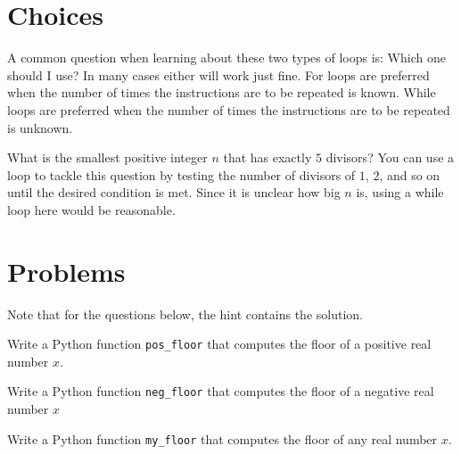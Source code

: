 \documentclass{ximera}
\begin{document}
\section{Choices}

A common question when learning about these two types of loops is: Which one should I use? In many cases either will work just fine. For loops are preferred when the number of times the instructions are to be repeated is known. While loops are preferred when the number of times the instructions are to be repeated is unknown.

What is the smallest positive integer $n$ that has exactly $5$ divisors? You can use a loop to tackle this question by testing the number of divisors of $1$, $2$, and so on until the desired condition is met. Since it is unclear how big $n$ is, using a while loop here would be reasonable.

\section{Problems}

Note that for the questions below, the hint contains the solution.

\begin{question}
	Write a Python function \verb|pos_floor| that computes the floor of a positive real number $x$.
\begin{hint}
\begin{sageCell}

\end{sageCell}
\end{hint}
\end{question}

\begin{question}
	Write a Python function \verb|neg_floor| that computes the floor of a negative real number $x$
\begin{hint}
\begin{sageCell}

\end{sageCell}
\end{hint}
\end{question}

\begin{question}
	Write a Python function \verb|my_floor| that computes the floor of any real number $x$.
\begin{hint}
\begin{sageCell}

\end{sageCell}
\end{hint}
\end{question}
\end{document}
